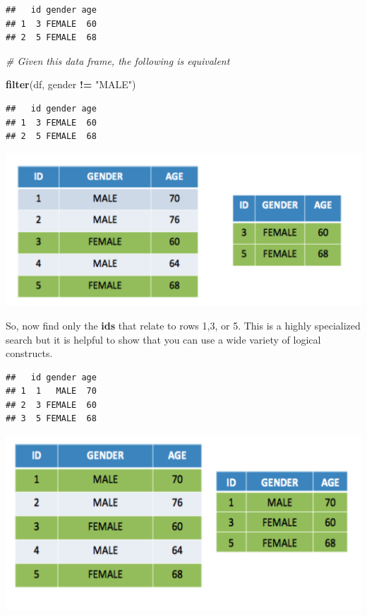 \documentclass[]{book}
\newenvironment{Shaded}{\begin{snugshade}}{\end{snugshade}}
\newcommand{\CommentTok}[1]{\textcolor[rgb]{0.56,0.35,0.01}{\textit{#1}}}
\newcommand{\DecValTok}[1]{\textcolor[rgb]{0.00,0.00,0.81}{#1}}
\newcommand{\KeywordTok}[1]{\textcolor[rgb]{0.13,0.29,0.53}{\textbf{#1}}}
\newcommand{\NormalTok}[1]{#1}
\newcommand{\OperatorTok}[1]{\textcolor[rgb]{0.81,0.36,0.00}{\textbf{#1}}}
\newcommand{\StringTok}[1]{\textcolor[rgb]{0.31,0.60,0.02}{#1}}
\begin{document}
\begin{verbatim}
##   id gender age
## 1  3 FEMALE  60
## 2  5 FEMALE  68
\end{verbatim}

\begin{Shaded}
\begin{Highlighting}[]
\CommentTok{# Given this data frame, the following is equivalent }

\KeywordTok{filter}\NormalTok{(df, gender }\OperatorTok{!=}\StringTok{ "MALE"}\NormalTok{)}
\end{Highlighting}
\end{Shaded}

\begin{verbatim}
##   id gender age
## 1  3 FEMALE  60
## 2  5 FEMALE  68
\end{verbatim}

\includegraphics{./figures/df2.png}

So, now find only the \textbf{ids} that relate to rows 1,3, or 5. This is a highly specialized search but it is helpful to show that you can use a wide variety of logical constructs.

\begin{Shaded}
\end{Shaded}

\begin{verbatim}
##   id gender age
## 1  1   MALE  70
## 2  3 FEMALE  60
## 3  5 FEMALE  68
\end{verbatim}

\includegraphics{./figures/df3.png}
\end{document}
